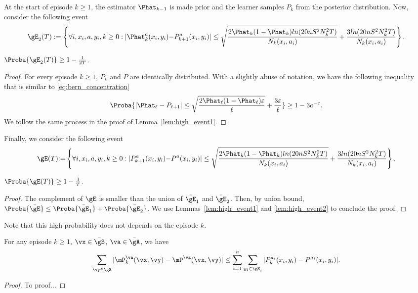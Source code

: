 At the start of episode $k\ge1$, the estimator $\Phat_{k-1}$ is made prior and the learner samples $P_k$ from the posterior distribution.
Now, consider the following event
\begin{align}
    \gE_2(T):=\left\{\forall i,x_i,a,y_i,k\ge0: |\Phat_k^a(x_i,y_i) {-}P_{k+1}^a(x_i,y_i)|\le \sqrt{\frac{2\Phat_k(1-\Phat_k)ln(20nS^2N_k^2T)}{N_k(x_i,a_i)}} +\frac{3ln(20nS^2N_k^2T)}{N_k(x_i,a_i)}\right\}. \label{eq:event_2}
\end{align}
\begin{lem}
    \label{lem:high_event2}
    $\Proba{\gE_2(T)}\ge 1-\frac1{2T}$.
\end{lem}
\begin{proof}
For every episode $k\ge1$, $P_k$ and $P$ are identically distributed.
With a slightly abuse of notation, we have the following inequality that is similar to \eqref{eq:bern_concentration}
\begin{align*}
    \Proba{|\Phat_\ell-P_{\ell+1}|\le\sqrt{\frac{2\Phat_\ell(1-\Phat_\ell)\varepsilon}{\ell}} +\frac{3\varepsilon}{\ell}} \ge 1-3e^{-\varepsilon}.
\end{align*}
We follow the same process in the proof of Lemma~\ref{lem:high_event1}.
\end{proof}

Finally, we consider the following event
\begin{align}
    \gE(T){:=}\left\{\forall i,x_i,a,y_i,k\ge0: |P_{k+1}^a(x_i,y_i) {-}P^a(x_i,y_i)|\le \sqrt{\frac{2\Phat_{k}(1-\Phat_k)ln(20nS^2N_k^2T)}{N_k(x_i,a_i)}} +\frac{3ln(20nS^2N_k^2T)}{N_k(x_i,a_i)}\right\}. \label{eq:event}
\end{align}

\begin{lem}
    \label{lem:high_event}
    $\Proba{\gE(T)}\ge 1-\frac1{T}$.
\end{lem}
\begin{proof}
The complement of $\gE$ is smaller than the union of $\bar{\gE}_1$ and $\bar{\gE}_2$.
Then, by union bound, $\Proba{\bar{\gE}}\le \Proba{\bar{\gE}_1} +\Proba{\bar{\gE}_2}$.
We use Lemmas~\ref{lem:high_event1} and \ref{lem:high_event2} to conclude the proof.
\end{proof}

Note that this high probability does not depends on the episode $k$.

\begin{lem}
    \label{lem:global_conc}
    For any episode $k\ge1$, $\vx\in\bar{\gS}$, $\va\in\bar{\gA}$, we have
    \begin{align}
        \sum_{\vy\in\bar{\gS}}|\mP_k^{\va}(\vx,\vy) -\mP^{\va}(\vx,\vy)| 
        \le \sum_{i=1}^{n} \sum_{y_i\in\gS_i} |P_k^{a_i}(x_i,y_i) -P^{a_i}(x_i,y_i)|.
    \end{align}
\end{lem}
\begin{proof}
    To proof...
\end{proof}

